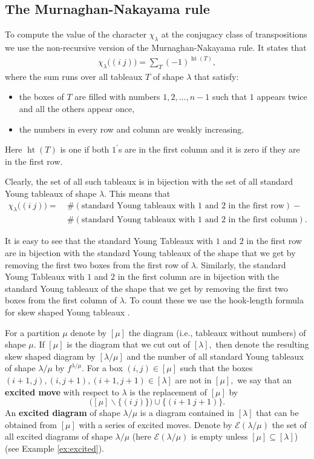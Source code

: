 \documentclass[12pt,dvipsnames,accepted=2016-08-18,a4paper,onecolumn]{quantumarticle}
\DeclareMathOperator{\het}{ht}
\numberwithin{equation}{section}
\theoremstyle{definition}
\begin{document}
\subsection{The Murnaghan-Nakayama rule}\label{sec:MNR}


	To compute the value of the character $\chi_\lambda$ at the conjugacy class of transpositions we use the non-recursive version of the Murnaghan-Nakayama rule. It states that
	\begin{align}\label{eq:mn}
		\chi_\lambda \big( (i\ j) \big) =
		\sum_T (-1)^{\het(T)},
	\end{align}
where the sum runs over all tableaux $T$ of shape $\lambda$ that satisfy:
\begin{itemize}
	\item the boxes of $T$ are filled with numbers $1,2,\ldots, n-1$ such that $1$ appears twice and all the others appear once,
	\item the numbers in every row and column are weakly increasing.
\end{itemize}
Here $\het(T)$ is one if both $1^\prime$s are in the first column and it is zero if they are in the first row. 

Clearly, the set of all such tableaux is in bijection with the set of all standard Young tableaux of shape $\lambda.$ This means that 
\begin{align*}
	\chi_\lambda \big( (i\ j) \big) =\ 
	&\#(\text{standard Young tableaux with }1 \text{ and } 2 \text{ in the first row}) - \\
	&\#(\text{standard Young tableaux with }1 \text{ and } 2 \text{ in the first column}).
\end{align*}

It is easy to see that the standard Young Tableaux with $1$ and $2$ in the first row are in bijection with the standard Young tableaux of the shape that we get by removing the first two boxes from the first row of $\lambda.$ Similarly, the standard Young Tableaux with $1$ and $2$ in the first column are in bijection with the standard Young tableaux of the shape that we get by removing the first two boxes from the first column of $\lambda.$
To count these we use the hook-length formula for skew shaped Young tableaux \cite{Nar,MPP}. 

For a partition $\mu$ denote by $[\mu]$ the diagram (i.e., tableaux without numbers) of shape $\mu.$ If $[\mu]$ is the diagram that we cut out of $[\lambda],$ then denote the resulting skew shaped diagram by $[\lambda / \mu]$ and the number of all standard Young tableaux of shape $\lambda / \mu$ by $f^{\lambda / \mu}.$ For a box  $(i,j) \in [\mu]$ such that the boxes $(i+1,j),(i,j+1),(i+1,j+1) \in [\lambda]$ are not in $[\mu],$ we say that an \textbf{excited move} with respect to $\lambda$ is the replacement of $[\mu]$ by 
$$
\Big([\mu] \backslash \{(i\ j)\}\Big) \cup  \{(i+1\ j+1)\}.
$$
An \textbf{excited diagram} of shape $\lambda / \mu$ is a diagram contained in $[\lambda]$ that can be obtained from $[\mu]$ with a series of excited moves. Denote by $\mathcal{E}(\lambda / \mu)$ the set of all excited diagrams of shape $\lambda / \mu$ (here $\mathcal{E}(\lambda / \mu)$ is empty unless $[\mu] \subseteq [\lambda]$) (see Example \ref{ex:excited}).
\end{document}
